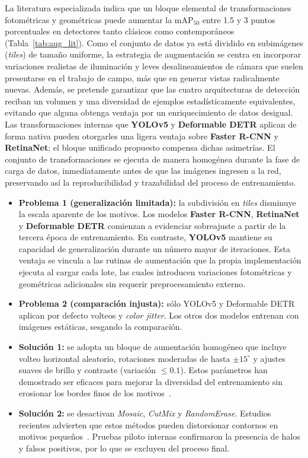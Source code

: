 La literatura especializada indica que un bloque elemental de transformaciones fotométricas y geométricas puede aumentar la \(\text{mAP}_{50}\) entre 1.5 y 3 puntos porcentuales en detectores tanto clásicos como contemporáneos (Tabla~\ref{tab:aug_lit}).
Como el conjunto de datos ya está dividido en subimágenes (\emph{tiles}) de tamaño uniforme, la estrategia de augmentación se centra en incorporar variaciones realistas de iluminación y leves desalineamientos de cámara que suelen presentarse en el trabajo de campo, más que en generar vistas radicalmente nuevas.
Además, se pretende garantizar que las cuatro arquitecturas de detección reciban un volumen y una diversidad de ejemplos estadísticamente equivalentes, evitando que alguna obtenga ventaja por un enriquecimiento de datos desigual.
Las transformaciones internas que \textbf{YOLOv5} y \textbf{Deformable DETR} aplican de forma nativa pueden otorgarles una ligera ventaja sobre \textbf{Faster R-CNN} y \textbf{RetinaNet}; el bloque unificado propuesto compensa dichas asimetrías.
El conjunto de transformaciones se ejecuta de manera homogénea durante la fase de carga de datos, inmediatamente antes de que las imágenes ingresen a la red, preservando así la reproducibilidad y trazabilidad del proceso de entrenamiento.

\begin{itemize}
   \item \textbf{Problema 1 (generalización limitada):} la subdivisión en \emph{tiles} disminuye la escala aparente de los motivos.
      Los modelos \textbf{Faster R-CNN}, \textbf{RetinaNet} y \textbf{Deformable DETR} comienzan a evidenciar sobreajuste a partir de la tercera época de entrenamiento.
      En contraste, \textbf{YOLOv5} mantiene su capacidad de generalización durante un número mayor de iteraciones.
      Esta ventaja se vincula a las rutinas de aumentación que la propia implementación ejecuta al cargar cada lote, las cuales introducen variaciones fotométricas y geométricas adicionales sin requerir preprocesamiento externo.
   \item \textbf{Problema 2 (comparación injusta):} sólo YOLOv5 y Deformable DETR aplican por defecto volteos y \emph{color jitter}.
   Los otros dos modelos entrenan con imágenes estáticas, sesgando la comparación.
   \item \textbf{Solución 1:} se adopta un bloque de aumentación homogéneo que incluye volteo horizontal aleatorio, rotaciones moderadas de hasta \(\pm15^{\circ}\) y ajustes suaves de brillo y contraste (variación \(\leq 0.1\)).
   Estos parámetros han demostrado ser eficaces para mejorar la diversidad del entrenamiento sin erosionar los bordes finos de los motivos~\cite{cubuk2020autoaug,retinanetCOCO}.
   \item \textbf{Solución 2:} se desactivan \emph{Mosaic}, \emph{CutMix} y \emph{RandomErase}.
   Estudios recientes advierten que estos métodos pueden distorsionar contornos en motivos pequeños~\cite{rtdetr2024cvpr}.
   Pruebas piloto internas confirmaron la presencia de halos y falsos positivos, por lo que se excluyen del proceso final.
\end{itemize}

